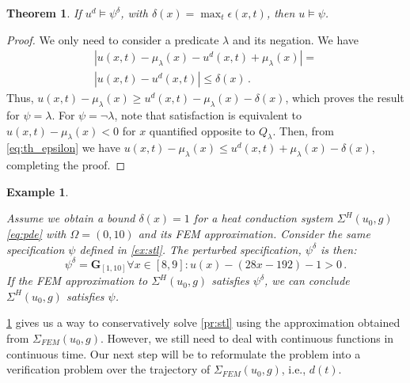 \documentclass[letterpaper, 10 pt, conference]{ieeeconf/ieeeconf}
\newtheorem{theorem}{Theorem}
\newtheorem{example}{Example}
\newcommand{\Always}{\mathbf{G}}
\begin{document}
\begin{theorem}
\label{th:epsilon_approximation}
    If $u^d \models \psi^{\delta}$, with $\delta(x) = \max_t \epsilon(x, t)$, then $u \models \psi$.
\end{theorem}
\begin{proof}
    We only need to consider a predicate $\lambda$ and its negation. We have
    \begin{multline}
        \label{eq:th_epsilon}
         |u(x, t) - \mu_\lambda(x) - u^d(x, t) + \mu_\lambda(x)| = \\
         |u(x, t) - u^d(x, t)| \leq \delta(x) \,.
    \end{multline}
    Thus, $u(x, t) - \mu_\lambda(x) \geq u^d(x, t) -
    \mu_\lambda(x) - \delta(x)$, which proves the result for $\psi = \lambda$. For $\psi
    = \lnot \lambda$, note that satisfaction is equivalent to $u(x, t) -
    \mu_\lambda(x) < 0$ for $x$ quantified opposite to $Q_\lambda$. Then, from
    \cref{eq:th_epsilon} we have $u(x, t) - \mu_\lambda(x) \leq u^d(x, t) +
    \mu_\lambda(x) - \delta(x)$, completing the proof.
\end{proof}

\begin{example}
    \label{ex:eps_approx}

    Assume we obtain a bound $\delta(x) = 1$ for a heat conduction system
    $\Sigma^H(u_0, g)$ \cref{eq:pde} with $\Omega = (0, 10)$ and its
    FEM approximation. Consider the same specification $\psi$ defined in \cref{ex:stl}.
    The perturbed specification, $\psi^\delta$ is then:
    \begin{equation}
        \psi^\delta = \Always_{[1,10]} \forall x \in [8,9] : u(x) - (28x -
        192) - 1 > 0 \,.
    \end{equation}
    If the FEM approximation to $\Sigma^H(u_0, g)$ satisfies $\psi^\delta$, we can
    conclude $\Sigma^H(u_0, g)$ satisfies $\psi$.
    
\end{example}

\cref{th:epsilon_approximation} gives us a way to conservatively solve
\cref{pr:stl} using the approximation obtained from $\Sigma_{FEM}(u_0, g)$.
However, we still need to deal with continuous functions in continuous time. Our
next step will be to reformulate the problem into a verification problem over
the trajectory of $\Sigma_{FEM}(u_0, g)$, i.e., $d(t)$.
\end{document}
